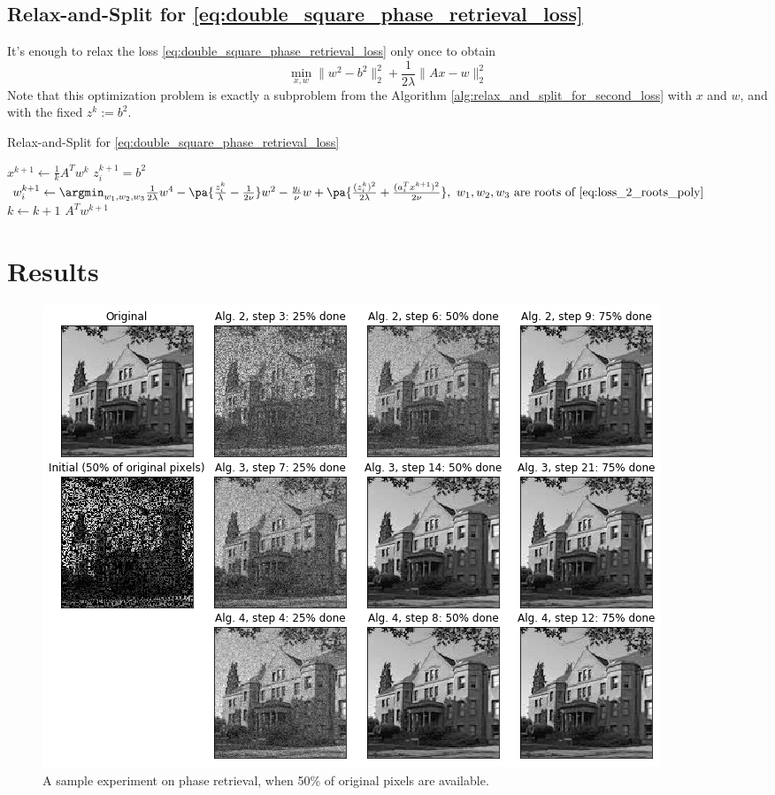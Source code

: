 \documentclass[11pt,letterpaper]{article}
\numberwithin{equation}{section} %
\numberwithin{figure}{section} %
\numberwithin{table}{section} %
\begin{document}
\subsection{Relax-and-Split for \ref{eq:double_square_phase_retrieval_loss}}
It's enough to relax the loss \ref{eq:double_square_phase_retrieval_loss} only once to obtain 
    \[
        \min_{x, w} \|w^2 - b^2\|_2^2 + \frac{1}{2\lambda}\|Ax - w\|_2^2
    \]
    Note that this optimization problem is exactly a subproblem from the Algorithm \ref{alg:relax_and_split_for_second_loss} with $x$ and $w$, and with the fixed $z^k := b^2$. 
    
\begin{algorithm}
    \caption{Relax-and-Split for \ref{eq:double_square_phase_retrieval_loss}}
    \label{alg:relax_and_split_for_thrird_loss}
    \begin{algorithmic}[1]
            \State $x^{k+1} \gets \frac{1}{k}A^Tw^{k}$ 
            \State $z_i^{k+1} = b^2$
            \State $w^{k+1}_i \gets \argmin_{w_1, w_2, w_3} \frac{1}{2\lambda}w^4 - \pa{\frac{z_i^{k}}{\lambda} - \frac{1}{2\nu}}w^2 - \frac{y_i}{\nu}w + \pa{\frac{(z_i^{k})^2}{2\lambda} + \frac{(a_i^Tx^{k+1})^2}{2\nu}},\ w_1, w_2, w_3 \text{ are roots of \ref{eq:loss_2_roots_poly}}$
            \State $k \gets k+1$
        \EndWhile
        \Return $A^Tw^{k+1}$
    \end{algorithmic}
\end{algorithm}

\section{Results} %

\begin{figure}
    \centering
    \includegraphics[width=\textwidth]{images/lewis_reconstruction}    
    \caption{\label{fig:lewis_reconstruction} A sample experiment on phase retrieval, when 50\% of original pixels are available.}
\end{figure}
\end{document}
